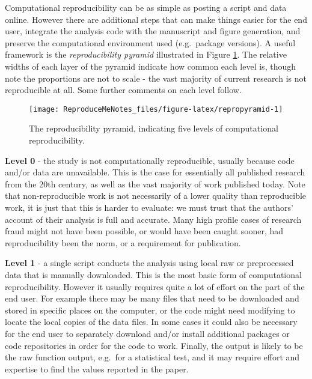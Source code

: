 \documentclass[
]{article}
\begin{document}
Computational reproducibility can be as simple as posting a script and data online. However there are additional steps that can make things easier for the end user, integrate the analysis code with the manuscript and figure generation, and preserve the computational environment used (e.g.~package versions). A useful framework is the \emph{reproducibility pyramid} illustrated in Figure \ref{fig:repropyramid}. The relative widths of each layer of the pyramid indicate how common each level is, though note the proportions are not to scale - the vast majority of current research is not reproducible at all. Some further comments on each level follow.

\begin{figure}

{\centering \texttt{[image: ReproduceMeNotes\_files/figure-latex/repropyramid-1]} 

}

\caption{The reproducibility pyramid, indicating five levels of computational reproducibility.}\label{fig:repropyramid}
\end{figure}

\textbf{Level 0} - the study is not computationally reproducible, usually because code and/or data are unavailable. This is the case for essentially all published research from the 20th century, as well as the vast majority of work published today. Note that non-reproducible work is not necessarily of a lower quality than reproducible work, it is just that this is harder to evaluate: we must trust that the authors' account of their analysis is full and accurate. Many high profile cases of research fraud might not have been possible, or would have been caught sooner, had reproducibility been the norm, or a requirement for publication.

\textbf{Level 1} - a single script conducts the analysis using local raw or preprocessed data that is manually downloaded. This is the most basic form of computational reproducibility. However it usually requires quite a lot of effort on the part of the end user. For example there may be many files that need to be downloaded and stored in specific places on the computer, or the code might need modifying to locate the local copies of the data files. In some cases it could also be necessary for the end user to separately download and/or install additional packages or code repositories in order for the code to work. Finally, the output is likely to be the raw function output, e.g.~for a statistical test, and it may require effort and expertise to find the values reported in the paper.
\end{document}
